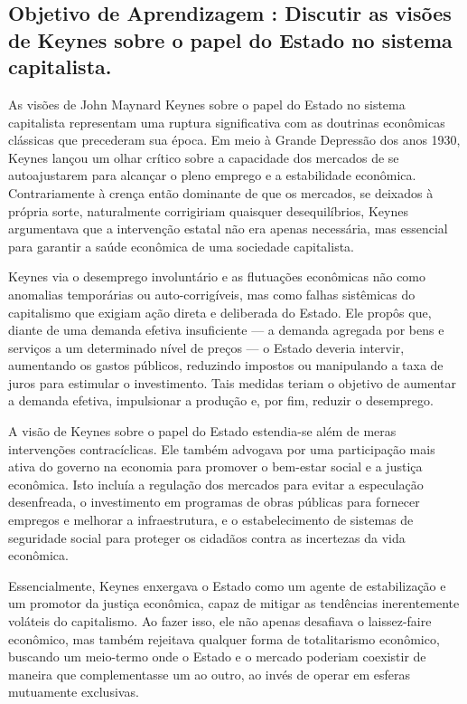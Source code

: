 \documentclass[a4paper,12pt]{article}[abntex2]
\begin{document}
\subsection{\textbf{Objetivo de Aprendizagem : Discutir as visões de Keynes sobre o papel do Estado no sistema capitalista.}}
As visões de John Maynard Keynes sobre o papel do Estado no sistema capitalista representam uma ruptura significativa com as doutrinas econômicas clássicas que precederam sua época. Em meio à Grande Depressão dos anos 1930, Keynes lançou um olhar crítico sobre a capacidade dos mercados de se autoajustarem para alcançar o pleno emprego e a estabilidade econômica. Contrariamente à crença então dominante de que os mercados, se deixados à própria sorte, naturalmente corrigiriam quaisquer desequilíbrios, Keynes argumentava que a intervenção estatal não era apenas necessária, mas essencial para garantir a saúde econômica de uma sociedade capitalista.

Keynes via o desemprego involuntário e as flutuações econômicas não como anomalias temporárias ou auto-corrigíveis, mas como falhas sistêmicas do capitalismo que exigiam ação direta e deliberada do Estado. Ele propôs que, diante de uma demanda efetiva insuficiente — a demanda agregada por bens e serviços a um determinado nível de preços — o Estado deveria intervir, aumentando os gastos públicos, reduzindo impostos ou manipulando a taxa de juros para estimular o investimento. Tais medidas teriam o objetivo de aumentar a demanda efetiva, impulsionar a produção e, por fim, reduzir o desemprego.

A visão de Keynes sobre o papel do Estado estendia-se além de meras intervenções contracíclicas. Ele também advogava por uma participação mais ativa do governo na economia para promover o bem-estar social e a justiça econômica. Isto incluía a regulação dos mercados para evitar a especulação desenfreada, o investimento em programas de obras públicas para fornecer empregos e melhorar a infraestrutura, e o estabelecimento de sistemas de seguridade social para proteger os cidadãos contra as incertezas da vida econômica.

Essencialmente, Keynes enxergava o Estado como um agente de estabilização e um promotor da justiça econômica, capaz de mitigar as tendências inerentemente voláteis do capitalismo. Ao fazer isso, ele não apenas desafiava o laissez-faire econômico, mas também rejeitava qualquer forma de totalitarismo econômico, buscando um meio-termo onde o Estado e o mercado poderiam coexistir de maneira que complementasse um ao outro, ao invés de operar em esferas mutuamente exclusivas.
\end{document}
